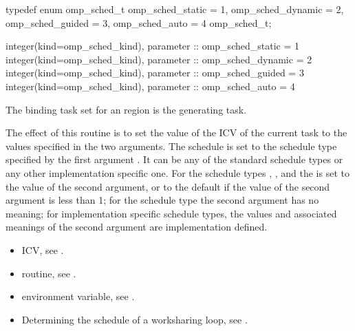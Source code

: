 \pagebreak
\ccppspecificstart
\begin{boxedcode}
typedef enum omp\_sched\_t {
    omp\_sched\_static = 1,
    omp\_sched\_dynamic = 2,
    omp\_sched\_guided = 3,
    omp\_sched\_auto = 4
} omp\_sched\_t;
\end{boxedcode}
\ccppspecificend

\begin{samepage}
\fortranspecificstart
\begin{boxedcode}
integer(kind=omp\_sched\_kind), parameter :: omp\_sched\_static = 1
integer(kind=omp\_sched\_kind), parameter :: omp\_sched\_dynamic = 2
integer(kind=omp\_sched\_kind), parameter :: omp\_sched\_guided = 3
integer(kind=omp\_sched\_kind), parameter :: omp\_sched\_auto = 4
\end{boxedcode}
\fortranspecificend
\end{samepage}

\binding
The binding task set for an  region is the generating task. 

\effect
The effect of this routine is to set the value of the  ICV of the current task 
to the values specified in the two arguments. The schedule is set to the schedule type 
specified by the first argument . It can be any of the standard schedule types or 
any other implementation specific one. For the schedule types , , and 
 the  is set to the value of the second argument, or to the default 
 if the value of the second argument is less than 1; for the schedule type 
 the second argument has no meaning; for implementation specific schedule types, 
the values and associated meanings of the second argument are implementation defined.

\crossreferences
\begin{itemize}
\item {} ICV, see 
.

\item {} routine, see 
.

\item {} environment variable, see 
.

\item Determining the schedule of a worksharing loop, see 
.
\end{itemize}









